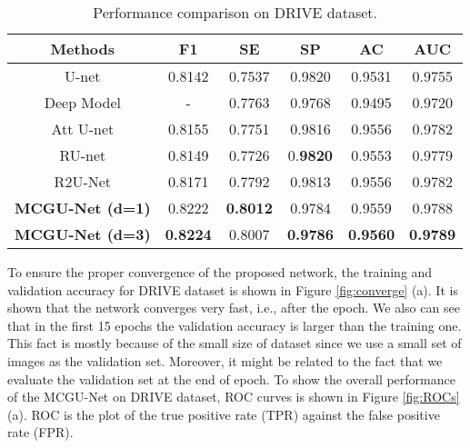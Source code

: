 \documentclass[journal]{IEEEtran}
\begin{document}
\begin{table}
\centering
    \vspace*{-\baselineskip}
\caption{Performance comparison on DRIVE dataset.}
	\begin{tabular}{cccccc}
		\hline
		\textbf{Methods} & \textbf{F1}&	\textbf{SE}&	\textbf{SP}&	\textbf{AC}&	\textbf{AUC}\\
		\hline
U-net \cite{ronneberger2015} & 0.8142&	0.7537&	0.9820&	0.9531&	0.9755\\
		Deep Model \cite{liskowski2016} & -&	0.7763&	0.9768&	0.9495&	0.9720\\
		Att U-net \cite{oktay2018} & 0.8155&	0.7751&	0.9816&	0.9556&	0.9782\\
		RU-net \cite{alom2018} & 0.8149&	0.7726&	0.\textbf{9820}&	0.9553&	0.9779\\
		R2U-Net \cite{alom2018} &0.8171& 0.7792&	0.9813&	0.9556&	0.9782\\
\hline
		\textbf{MCGU-Net (d=1)} & 0.8222& \textbf{0.8012}& 0.9784 &0.9559 & 0.9788\\
		\textbf{MCGU-Net (d=3)} & \textbf{0.8224} &0.8007& \textbf{0.9786}&	\textbf{0.9560}& \textbf{0.9789}\\
		\hline
	\end{tabular}
	\label{tab:drive}
\end{table}




To ensure the proper convergence of the proposed network, the training and validation accuracy for DRIVE dataset is shown in Figure \ref{fig:converge} (a). It is shown that the network converges very fast, i.e., after the  epoch. We also can see that in the first 15 epochs the validation accuracy is larger than the training one. This fact is mostly because of the small size of dataset since we use a small set of images as the validation set. Moreover, it might be related to the fact that we evaluate the validation set at the end of epoch. To show the overall performance of the MCGU-Net on DRIVE dataset, ROC curves is shown in Figure \ref{fig:ROCs} (a). ROC is the plot of the true positive rate (TPR) against the false positive rate (FPR). 
\end{document}
